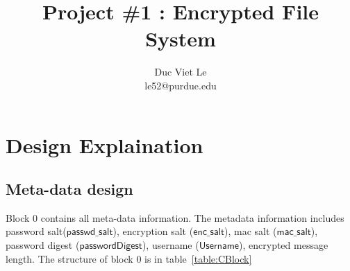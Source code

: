 \documentclass[a4paper,10pt]{article}
\begin{document}
%
   \title{Project \#1 : Encrypted File System}

   \author{Duc Viet Le \\ le52@purdue.edu}
          
   \date{}

   \maketitle
\section{Design Explaination}
\subsection{Meta-data design} %
\label{sub:meta_data_design}
Block 0 contains all meta-data information. The metadata information includes password salt($\mathsf{passwd\_salt}$), encryption salt ($\mathsf{enc\_salt}$), mac salt ($\mathsf{mac\_salt}$), password digest ($\mathsf{passwordDigest}$), username ($\mathsf{Username}$), encrypted message length. The structure of block 0 is in table~\ref{table:CBlock}
\end{document}
